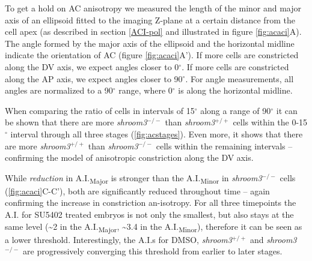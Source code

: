 \documentclass[10pt, b5paper, singlespacinge, twoside]{reedthesis} %
\theoremstyle{definition}
\theoremstyle{definition}
\theoremstyle{definition}
\theoremstyle{remark}
\begin{document}
To get a hold on AC anisotropy we measured the length of the minor and major axis of an ellipsoid fitted to the imaging Z-plane at a certain distance from the cell apex (as described in section \ref{ACI-pol} and illustrated in figure \ref{fig:acaci}A). The angle formed by the major axis of the ellipsoid and the horizontal midline indicate the orientation of AC (figure \ref{fig:acaci}A'). If more cells are constricted along the DV axis, we expect angles closer to 0\(^\circ\). If more cells are constricted along the AP axis, we expect angles closer to 90\(^\circ\). For angle measurements, all angles are normalized to a 90\(^\circ\) range, where 0\(^\circ\) is along the horizontal midline.

When comparing the ratio of cells in intervals of 15\(^\circ\) along a range of 90\(^\circ\) it can be shown that there are more \emph{shroom3}\(^{-/-}\) than \emph{shroom3}\(^{+/+}\) cells within the 0-15\(^\circ\) interval through all three stages (\ref{fig:acstages}). Even more, it shows that there are more \emph{shroom3}\(^{+/+}\) than \emph{shroom3}\(^{-/-}\) cells within the remaining intervals -- confirming the model of anisotropic constriction along the DV axis.

While \emph{reduction} in A.I.\textsubscript{Major} is stronger than the A.I.\textsubscript{Minor} in \emph{shroom3}\(^{-/-}\) cells (\ref{fig:acaci}C-C'), both are significantly reduced throughout time -- again confirming the increase in constriction an-isotropy. For all three timepoints the A.I. for SU5402 treated embryos is not only the smallest, but also stays at the same level (\textasciitilde2 in the A.I.\textsubscript{Major}, \textasciitilde3.4 in the A.I.\textsubscript{Minor}), therefore it can be seen as a lower threshold. Interestingly, the A.I.s for DMSO, \emph{shroom3}\(^{+/+}\) and \emph{shroom3}\(^{-/-}\) are progressively converging this threshold from earlier to later stages.
\end{document}
